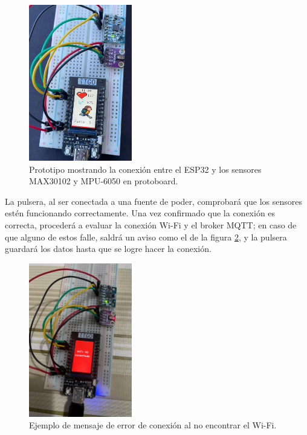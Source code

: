 \documentclass[12pt, a4paper]{article}
\begin{document}
	\begin{figure}[htbp]
		\centering
		\includegraphics[width=0.4\textwidth]{images/prototipo.jpg}
		\caption[Prototipo]{Prototipo mostrando la conexión entre el ESP32 y los sensores MAX30102 y MPU-6050 en protoboard.}
		\label{fig:prototipo}
	\end{figure}

	La pulsera, al ser conectada a una fuente de poder, comprobará que los sensores estén funcionando correctamente. Una vez confirmado que la conexión es correcta, procederá a evaluar la conexión Wi-Fi y el broker MQTT; en caso de que alguno de estos falle, saldrá un aviso como el de la figura \ref{fig:error}, y la pulsera guardará los datos hasta que se logre hacer la conexión.
		
	\begin{figure}[htbp]
		\centering
		\includegraphics[width=0.4\textwidth]{images/error_wifi.jpg}
		\caption[Ejemplo]{Ejemplo de mensaje de error de conexión al no encontrar el Wi-Fi.}
		\label{fig:error}
	\end{figure}
	
\end{document}
